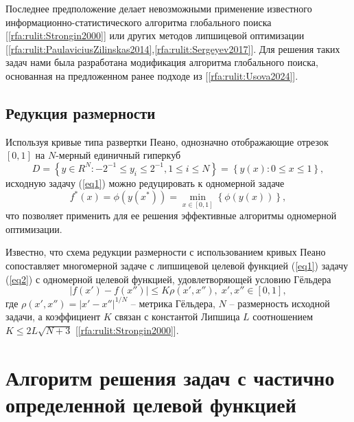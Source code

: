\documentclass[a4paper,12pt,russian]{article}
\begin{document}
Последнее предположение делает невозможными применение известного ин\-фор\-ма\-ци\-он\-но-ста\-тис\-ти\-чес\-ко\-го алгоритма глобального поиска [\ref{rfa:rulit:Strongin2000}] или других методов липшицевой оптимизации [\ref{rfa:rulit:PaulaviciusZilinskas2014},\ref{rfa:rulit:Sergeyev2017}]. Для решения таких задач нами была разработана модификация алгоритма глобального поиска, основанная на предложенном ранее подходе из [\ref{rfa:rulit:Usova2024}].

\subsection{Редукция размерности}

Используя кривые типа развертки Пеано, однозначно отображающие отрезок $[0,1]$ на $N$-мерный единичный гиперкуб
\begin{equation}\label{eq2_} 
D=\left\{ y \in R^N: -2^{-1} \leq y_i \leq 2^{-1}, 1 \leq i \leq N \right\} = \left\{ y(x): 0 \leq x \leq 1 \right\},
\end{equation}
исходную задачу (\ref{eq1}) можно редуцировать к одномерной задаче
\begin{equation}\label{eq2} 
f^*(x)=\phi(y(x^* ))=\min_{x \in [0,1]} \left\{ \phi(y(x)) \right\},
\end{equation}
что позволяет применить для ее решения эффективные алгоритмы одномерной оптимизации. %


Известно, что схема редукции размерности с использованием кривых Пеано сопоставляет многомерной задаче с липшицевой целевой функцией (\ref{eq1}) задачу (\ref{eq2}) с одномерной целевой функцией, удовлетворяющей условию Гёльдера
\begin{equation}\label{eq4} 
| f(x')-f(x'') | \leq K \rho(x',x''), \; x',x'' \in [0,1],
\end{equation}
где $\rho(x',x'') =  |x' - x''|^{1/N}$ -- метрика Гёльдера, $N$ -- размерность исходной задачи, а коэффициент $K$ связан с константой Липшица $L$ соотношением $K \leq 2L\sqrt {N+3}$ [\ref{rfa:rulit:Strongin2000}].

\section{Алгоритм решения задач с частично определенной целевой функцией}\label{alg_discr}
\end{document}
